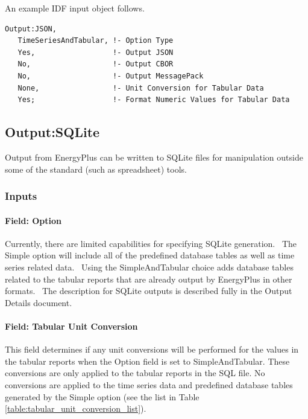 An example IDF input object follows.
\begin{lstlisting}
Output:JSON,
   TimeSeriesAndTabular, !- Option Type
   Yes,                  !- Output JSON
   No,                   !- Output CBOR
   No,                   !- Output MessagePack
   None,                 !- Unit Conversion for Tabular Data
   Yes;                  !- Format Numeric Values for Tabular Data      
\end{lstlisting}

\subsection{Output:SQLite}\label{outputsqlite}

Output from EnergyPlus can be written to SQLite files for manipulation outside some of the standard (such as spreadsheet) tools.

\subsubsection{Inputs}\label{inputs-12-014}

\paragraph{Field: Option}\label{field-option}

Currently, there are limited capabilities for specifying SQLite generation.~ The Simple option will include all of the predefined database tables as well as time series related data.~ Using the SimpleAndTabular choice adds database tables related to the tabular reports that are already output by EnergyPlus in other formats.~ The description for SQLite outputs is described fully in the Output Details document.

\paragraph{Field: Tabular Unit Conversion}\label{field-tabular-unit-conversion}

This field determines if any unit conversions will be performed for the values in the tabular reports when the Option field is set to SimpleAndTabular. These conversions are only applied to the tabular reports in the SQL file. No conversions are applied to the time series data and predefined database tables generated by the Simple option (see the list in Table \ref{table:tabular_unit_conversion_list}).

